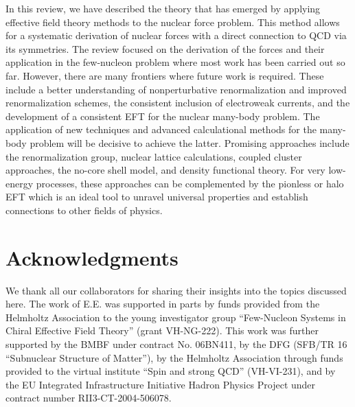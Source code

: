 \documentclass[aps,rmp,nofootinbib,twocolumn,floatfix]{revtex4}
\begin{document}
In this review, we have described the theory  
that has emerged by applying effective field theory methods to the
nuclear force problem. This method allows for a systematic derivation 
of nuclear forces with a direct connection to QCD via its symmetries.
The review focused on the derivation of the forces and their
application in the few-nucleon problem where most work has been carried
out so far. However, there are many  frontiers where future 
work is required. These include a better understanding of 
nonperturbative renormalization and improved renormalization schemes,
the consistent inclusion of electroweak currents, and the development
of a consistent EFT for the nuclear many-body problem. 
The application of new techniques and
advanced calculational methods for the many-body problem will be decisive 
to achieve the latter. Promising approaches include the renormalization
group, nuclear lattice calculations, coupled cluster approaches,
the no-core shell model, and density functional theory.
For very low-energy processes, these approaches can be complemented by 
the pionless or halo EFT which is an ideal tool to unravel universal
properties and establish connections to other fields of physics. 

\section*{Acknowledgments}

We thank all our collaborators for sharing their insights into
the topics discussed here. The work of E.E. was supported 
in parts by funds provided from the Helmholtz Association 
to the young investigator group ``Few-Nucleon Systems in 
Chiral Effective Field Theory'' (grant  VH-NG-222).
This work was further supported by the BMBF under contract No.
06BN411, by the DFG (SFB/TR 16 ``Subnuclear Structure
of Matter''), by the Helmholtz Association through funds provided 
to the virtual institute ``Spin and strong QCD'' (VH-VI-231),
and by the EU Integrated Infrastructure Initiative Hadron
Physics Project under contract number RII3-CT-2004-506078.
\end{document}
